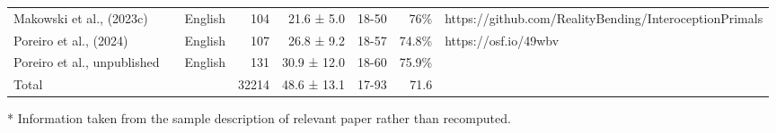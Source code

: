 \begin{table}[!t]
\begin{tabular*}{\linewidth}{@{\extracolsep{\fill}}lllrrrrl}
Makowski et al., (2023c) &  & English & 104 & 21.6 ± 5.0 & 18-50 & 76\% & https://github.com/RealityBending/InteroceptionPrimals \\ 
Poreiro et al., (2024) &  & English & 107 & 26.8 ± 9.2 & 18-57 & 74.8\% & https://osf.io/49wbv \\ 
Poreiro et al., unpublished &  & English & 131 & 30.9 ± 12.0 & 18-60 & 75.9\% &  \\ 
Total &  &  & 32214 & 48.6 ± 13.1 & 17-93 & 71.6 &  \\ 
\bottomrule
\end{tabular*}
\begin{minipage}{\linewidth}
* Information taken from the sample description of relevant paper rather than recomputed.\\
\end{minipage}
\end{table}

